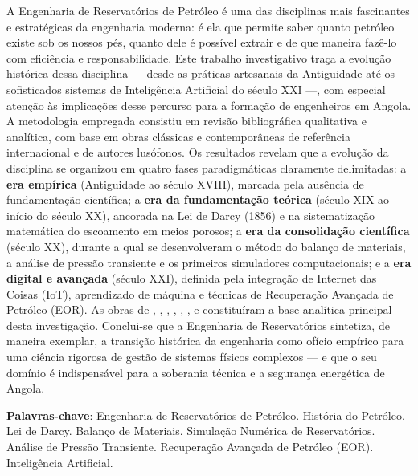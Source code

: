 \documentclass[
  12pt,
  a4paper,
  oneside,
  brazilian,
  sumario=tradicional
]{abntex2}
\begin{document}
\setlength{\absparsep}{18pt}
\begin{resumo}
A Engenharia de Reservatórios de Petróleo é uma das disciplinas mais
fascinantes e estratégicas da engenharia moderna: é ela que permite
saber quanto petróleo existe sob os nossos pés, quanto dele é possível
extrair e de que maneira fazê-lo com eficiência e responsabilidade.
Este trabalho investigativo traça a evolução histórica dessa disciplina
— desde as práticas artesanais da Antiguidade até os sofisticados
sistemas de Inteligência Artificial do século XXI —, com especial
atenção às implicações desse percurso para a formação de engenheiros
em Angola. A metodologia empregada consistiu em revisão bibliográfica
qualitativa e analítica, com base em obras clássicas e contemporâneas
de referência internacional e de autores lusófonos. Os resultados
revelam que a evolução da disciplina se organizou em quatro fases
paradigmáticas claramente delimitadas: a \textbf{era empírica}
(Antiguidade ao século XVIII), marcada pela ausência de fundamentação
científica; a \textbf{era da fundamentação teórica} (século XIX ao
início do século XX), ancorada na Lei de Darcy (1856) e na
sistematização matemática do escoamento em meios porosos; a \textbf{era
da consolidação científica} (século XX), durante a qual se desenvolveram
o método do balanço de materiais, a análise de pressão transiente e os
primeiros simuladores computacionais; e a \textbf{era digital e
avançada} (século XXI), definida pela integração de Internet das Coisas
(IoT), aprendizado de máquina e técnicas de Recuperação Avançada de
Petróleo (EOR). As obras de ,
, , ,
, , 
e  constituíram a base analítica principal desta
investigação. Conclui-se que a Engenharia de Reservatórios sintetiza,
de maneira exemplar, a transição histórica da engenharia como ofício
empírico para uma ciência rigorosa de gestão de sistemas físicos
complexos — e que o seu domínio é indispensável para a soberania
técnica e a segurança energética de Angola.

\vspace{\onelineskip}
\noindent
\textbf{Palavras-chave}: Engenharia de Reservatórios de Petróleo. História
do Petróleo. Lei de Darcy. Balanço de Materiais. Simulação Numérica de
Reservatórios. Análise de Pressão Transiente. Recuperação Avançada de
Petróleo (EOR). Inteligência Artificial.
\end{resumo}
\end{document}
